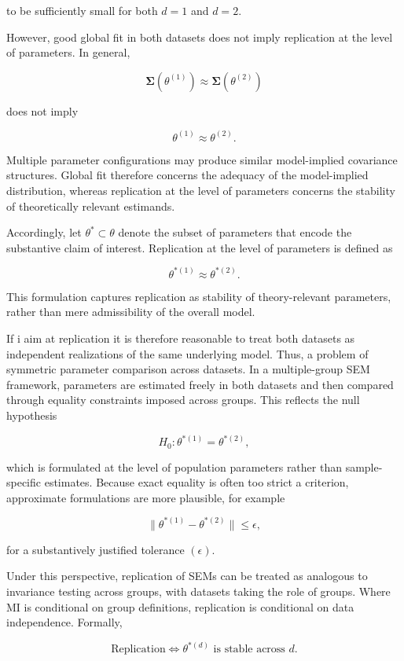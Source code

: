 \documentclass[
  12pt,
  letterpaper,
  man]{apa7}
\begin{document}
to be sufficiently small for both \(d = 1\) and \(d = 2\).

However, good global fit in both datasets does not imply replication at
the level of parameters. In general,

\[\boldsymbol{\Sigma}(\theta^{(1)}) \approx \boldsymbol{\Sigma}(\theta^{(2)})\]

does not imply

\[\theta^{(1)} \approx \theta^{(2)}. \]

Multiple parameter configurations may produce similar model-implied
covariance structures. Global fit therefore concerns the adequacy of the
model-implied distribution, whereas replication at the level of
parameters concerns the stability of theoretically relevant estimands.

Accordingly, let \(\theta^* \subset \theta\) denote the subset of
parameters that encode the substantive claim of interest. Replication at
the level of parameters is defined as

\[\theta^{*(1)} \approx \theta^{*(2)}. \]

This formulation captures replication as stability of theory-relevant
parameters, rather than mere admissibility of the overall model.

If i aim at replication it is therefore reasonable to treat both
datasets as independent realizations of the same underlying model. Thus,
a problem of symmetric parameter comparison across datasets. In a
multiple-group SEM framework, parameters are estimated freely in both
datasets and then compared through equality constraints imposed across
groups. This reflects the null hypothesis

\[ H_0: \theta^{*(1)} = \theta^{*(2)}, \]

which is formulated at the level of population parameters rather than
sample-specific estimates. Because exact equality is often too strict a
criterion, approximate formulations are more plausible, for example

\[\|\theta^{*(1)} - \theta^{*(2)}\| \le \epsilon, \]

for a substantively justified tolerance \((\epsilon)\).

Under this perspective, replication of SEMs can be treated as analogous
to invariance testing across groups, with datasets taking the role of
groups. Where MI is conditional on group definitions, replication is
conditional on data independence. Formally,

\[\text{Replication} \Longleftrightarrow \theta^{*(d)} \text{ is stable across } d. \]
\end{document}
